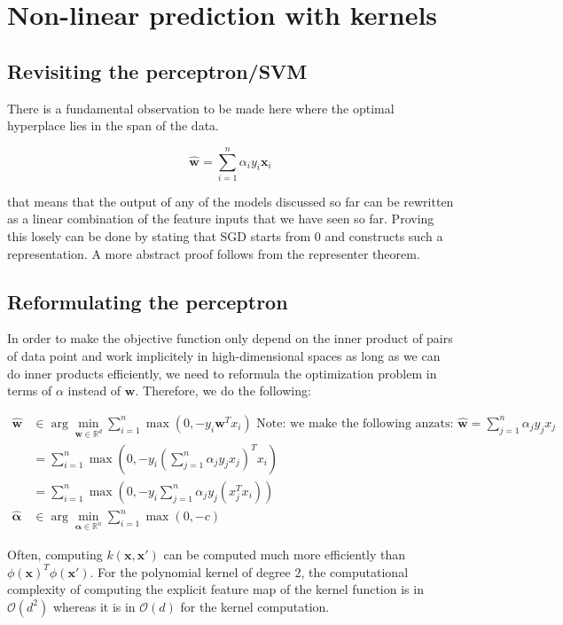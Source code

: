 \documentclass[a4paper,10pt,twoside]{article}
\begin{document}
\section{Non-linear prediction with kernels}

\subsection{Revisiting the perceptron/SVM}

There is a fundamental observation to be made here where the optimal hyperplace lies in the span of the data. 

\begin{equation*}
    \mathbf{\hat{w}}=\sum_{i=1}^{n}\alpha_iy_i\mathbf{x}_i
\end{equation*}

that means that the output of any of the models discussed so far can be rewritten as a linear combination of the feature inputs that we have seen so far. Proving this losely can be done by stating that SGD starts from 0 and constructs such a representation. A more abstract proof follows from the representer theorem.  

\subsection{Reformulating the perceptron}

In order to make the objective function only depend on the inner product of pairs of data point and work implicitely in high-dimensional spaces as long as we can do inner products efficiently, we need to reformula the optimization problem in terms of $\alpha$ instead of $\mathbf{w}$. Therefore, we do the following:

\begin{align*}
    \hat{\mathbf{w}}&\in\arg\min_{\mathbf{w}\in\mathbb{R}^d}\sum_{i=1}^{n}\max(0,-y_i\mathbf{w}^Tx_i)\text{ Note: we make the following anzats: }\hat{\mathbf{w}}=\sum_{j=1}^{n}\alpha_jy_jx_j\\
    &= \sum_{i=1}^{n}\max(0,-y_i(\sum_{j=1}^{n}\alpha_jy_jx_j)^Tx_i)\\
    &= \sum_{i=1}^{n}\max(0,-y_i\sum_{j=1}^{n}\alpha_jy_j(x_j^Tx_i))\\
    \hat{\mathbf{\alpha}}&\in\arg\min_{\mathbf{\alpha}\in\mathbb{R}^n}\sum_{i=1}^{n}\max(0,-c)
\end{align*}

Often, computing $k(\mathbf{x}, \mathbf{x}')$ can be computed much more efficiently than $\phi(\mathbf{x})^T\phi(\mathbf{x}')$. For the polynomial kernel of degree 2, the computational complexity of computing the explicit feature map of the kernel function is in $\mathcal{O}(d^2)$ whereas it is in $\mathcal{O}(d)$ for the kernel computation.
\end{document}
